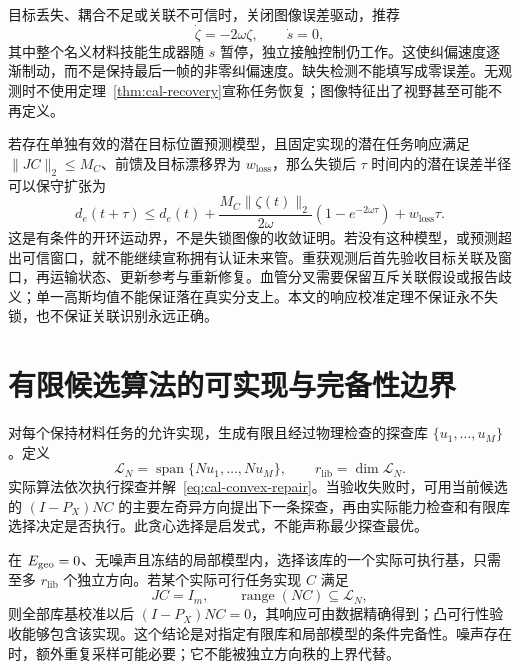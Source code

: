 \documentclass[11pt,a4paper]{article}
\numberwithin{equation}{section}
\theoremstyle{definition}
\begin{document}
目标丢失、耦合不足或关联不可信时，关闭图像误差驱动，推荐
\begin{equation}
 \dot\zeta=-2\omega\zeta,\qquad\dot s=0,
 \label{eq:cal-loss-mode}
\end{equation}
其中整个名义材料技能生成器随 $s$ 暂停，独立接触控制仍工作。这使纠偏速度逐渐制动，而不是保持最后一帧的非零纠偏速度。缺失检测不能填写成零误差。无观测时不使用定理~\ref{thm:cal-recovery}宣称任务恢复；图像特征出了视野甚至可能不再定义。

若存在单独有效的潜在目标位置预测模型，且固定实现的潜在任务响应满足 $\|JC\|_2\le M_C$、前馈及目标漂移界为 $w_{\mathrm{loss}}$，那么失锁后 $\tau$ 时间内的潜在误差半径可以保守扩张为
\begin{equation}
 d_e(t+\tau)\le d_e(t)
 +\frac{M_C\|\zeta(t)\|_2}{2\omega}
       (1-e^{-2\omega\tau})
 +w_{\mathrm{loss}}\tau.
 \label{eq:cal-loss-expansion}
\end{equation}
这是有条件的开环运动界，不是失锁图像的收敛证明。若没有这种模型，或预测超出可信窗口，就不能继续宣称拥有认证未来管。重获观测后首先验收目标关联及窗口，再运输状态、更新参考与重新修复。血管分叉需要保留互斥关联假设或报告歧义；单一高斯均值不能保证落在真实分支上。本文的响应校准定理不保证永不失锁，也不保证关联识别永远正确。

\section{有限候选算法的可实现与完备性边界}
\label{sec:cal-finite}

对每个保持材料任务的允许实现，生成有限且经过物理检查的探查库 $\{u_1,\ldots,u_M\}$。定义
\begin{equation}
  \mathcal L_N=
  \operatorname{span}\{Nu_1,\ldots,Nu_M\},
  \qquad r_{\mathrm{lib}}=\dim\mathcal L_N .
\end{equation}
实际算法依次执行探查并解~\eqref{eq:cal-convex-repair}。当验收失败时，可用当前候选的 $(I-P_X)NC$ 的主要左奇异方向提出下一条探查，再由实际能力检查和有限库选择决定是否执行。此贪心选择是启发式，不能声称最少探查最优。

在 $E_{\rm geo}=0$、无噪声且冻结的局部模型内，选择该库的一个实际可执行基，只需至多 $r_{\mathrm{lib}}$ 个独立方向。若某个实际可行任务实现 $C$ 满足
\begin{equation}
  JC=I_m,\qquad
  \operatorname{range}(NC)\subseteq\mathcal L_N ,
\end{equation}
则全部库基校准以后 $(I-P_X)NC=0$，其响应可由数据精确得到；凸可行性验收能够包含该实现。这个结论是对指定有限库和局部模型的条件完备性。噪声存在时，额外重复采样可能必要；它不能被独立方向秩的上界代替。
\end{document}
